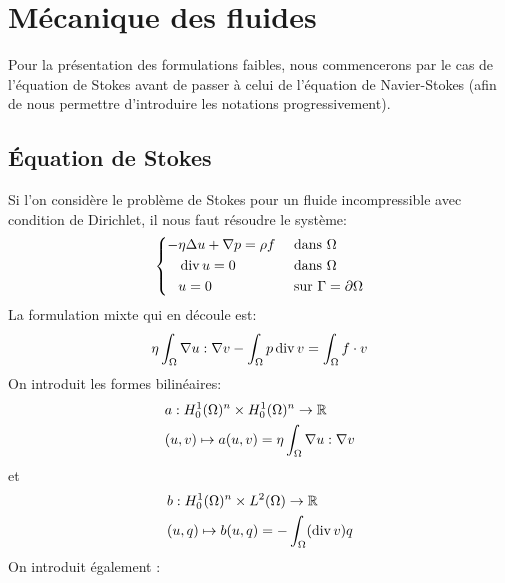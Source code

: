 \medskip
\section{Mécanique des fluides}
Pour la présentation des formulations faibles, nous commencerons par le cas de l'équation de Stokes avant de passer à celui de l'équation de Navier-Stokes (afin de nous permettre d'introduire les notations progressivement).


\medskip
\subsection{Équation de Stokes}
Si l'on considère le problème de Stokes pour un fluide incompressible avec condition de Dirichlet, il nous faut résoudre le système:
\begin{equation}\left\{
\begin{aligned}
-&\eta \Delta u + \nabla p = \rho f && \text{ dans } \Omega\\
&\operatorname{div} u = 0&& \text{ dans } \Omega\\
&u =0&& \text{ sur } \Gamma=\partial\Omega
\end{aligned}\right.
\end{equation}
La formulation mixte qui en découle est:
\begin{equation}
\eta\dint_\Omega \nabla u: \nabla v %
- \dint_\Omega p \dive v %
= \dint_\Omega f\cdot v %
\end{equation}
On introduit les formes bilinéaires:
\begin{equation}
\begin{aligned}
&a: H^1_0(\Omega)^n\times H^1_0(\Omega)^n \rightarrow \mathbb R \\
&(u,v) \mapsto a(u,v)=\eta\displaystyle\int_\Omega \nabla u: \nabla v
\end{aligned}
\end{equation}
et
\begin{equation}
\begin{aligned}
&b: H^1_0(\Omega)^n\times L^2(\Omega) \rightarrow \mathbb R\\
&(u,q) \mapsto b(u,q)=-\displaystyle\int_\Omega (\operatorname{div} v) q
\end{aligned}
\end{equation}
\medskip
On introduit également :
